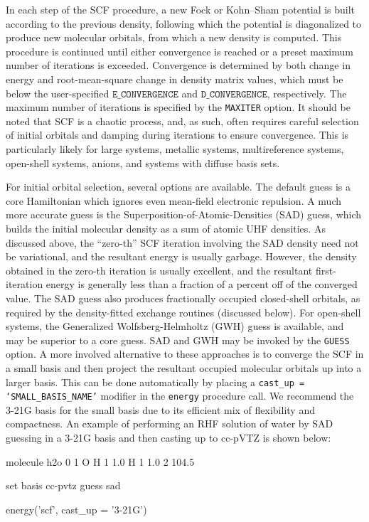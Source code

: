 In each step of the SCF procedure, a new Fock or Kohn--Sham potential is built
according to the previous density, following which the potential is diagonalized
to produce new molecular orbitals, from which a new density is computed. This
procedure is continued until either convergence is reached or a preset maximum
number of iterations is exceeded. Convergence is determined by both change in
energy and root-mean-square change in density matrix values, which must be below
the user-specified $\mathtt{E\_CONVERGENCE}$ and
$\mathtt{D\_CONVERGENCE}$, respectively. The maximum number of iterations is
specified by the \texttt{MAXITER} option. It should be noted that SCF is a
chaotic process, and, as such, often requires careful selection of initial
orbitals and damping during iterations to ensure convergence. This is
particularly likely for large systems, metallic systems, multireference systems,
open-shell systems, anions, and systems with diffuse basis sets. 

For initial orbital selection, several options are available. The default guess
is a core Hamiltonian which ignores even mean-field electronic repulsion. A much
more accurate guess is the Superposition-of-Atomic-Densities (SAD) guess, which
builds the initial molecular density as a sum of atomic UHF densities. As
discussed above, the ``zero-th'' SCF iteration involving the SAD density need
not be variational, and the resultant energy is usually garbage. However, the
density obtained in the zero-th iteration is usually excellent, and the
resultant first-iteration energy is generally less than a fraction of a percent
off of the converged value. The SAD guess also produces fractionally occupied
closed-shell orbitals, as required by the density-fitted exchange routines
(discussed below). For open-shell systems, the Generalized Wolfsberg-Helmholtz
(GWH) guess is available, and may be superior to a core guess. SAD and GWH may
be invoked by the \texttt{GUESS} option. A more involved alternative to these
approaches is to converge the SCF in a small basis and then project the
resultant occupied molecular orbitals up into a larger basis. This can be done
automatically by placing a \texttt{cast\_up = `SMALL\_BASIS\_NAME'} modifier in
the \texttt{energy} procedure call. We recommend the 3-21G basis for the small
basis due to its efficient mix of flexibility and compactness. An example of
performing an RHF solution of water by SAD guessing in a 3-21G basis and then
casting up to cc-pVTZ is shown below: 
\begin{Snippet}
molecule h2o {
0 1
O
H 1 1.0
H 1 1.0 2 104.5
}

set {
basis cc-pvtz 
guess sad
}

energy('scf', cast_up = '3-21G')
\end{Snippet}

